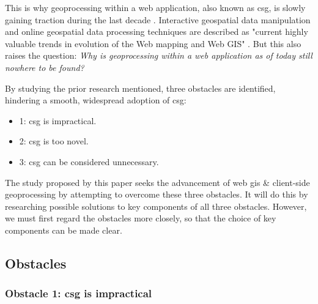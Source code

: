 This is why \ac{geoprocessing} within a web application, also known as \ac{csg}, is slowly gaining traction during the last decade \cite{kulawiak_analysis_2019, panidi_hybrid_2015, hamilton_client-side_2014}. Interactive geospatial data manipulation and online geospatial data processing techniques are described as "current highly valuable trends in evolution of the Web mapping and Web GIS" \cite{panidi_hybrid_2015}. But this also raises the question: \textit{Why is geoprocessing within a web application as of today still nowhere to be found?} 

By studying the prior research mentioned, three obstacles are identified, hindering a smooth, widespread adoption of \ac{csg}: 
\begin{itemize}
  \item 1: \ac{csg} is impractical.
  \item 2: \ac{csg} is too novel.
  \item 3: \ac{csg} can be considered unnecessary.
\end{itemize}

The study proposed by this paper seeks the advancement of web \ac{gis} \& client-side geoprocessing by attempting to overcome these three obstacles. It will do this by researching possible solutions to key components of all three obstacles. However, we must first regard the obstacles more closely, so that the choice of key components can be made clear. 

\newpage
\subsection{Obstacles}
\subsubsection*{Obstacle 1: \ac{csg} is impractical}


